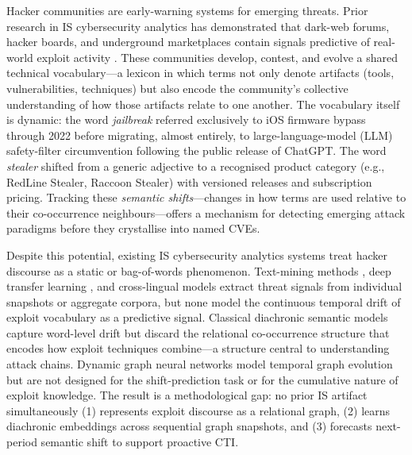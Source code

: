 \documentclass[12pt]{article}
\begin{document}
Hacker communities are early-warning systems for emerging threats. Prior research in IS cybersecurity analytics has demonstrated that dark-web forums, hacker boards, and underground marketplaces contain signals predictive of real-world exploit activity \parencite{samtani2017, samtani2022, ebrahimi2022, nunes2016}. These communities develop, contest, and evolve a shared technical vocabulary---a lexicon in which terms not only denote artifacts (tools, vulnerabilities, techniques) but also encode the community's collective understanding of how those artifacts relate to one another. The vocabulary itself is dynamic: the word \textit{jailbreak} referred exclusively to iOS firmware bypass through 2022 before migrating, almost entirely, to large-language-model (LLM) safety-filter circumvention following the public release of ChatGPT. The word \textit{stealer} shifted from a generic adjective to a recognised product category (e.g., RedLine Stealer, Raccoon Stealer) with versioned releases and subscription pricing. Tracking these \textit{semantic shifts}---changes in how terms are used relative to their co-occurrence neighbours---offers a mechanism for detecting emerging attack paradigms before they crystallise into named CVEs.

Despite this potential, existing IS cybersecurity analytics systems treat hacker discourse as a static or bag-of-words phenomenon. Text-mining methods \parencite{samtani2017, tavabi2018}, deep transfer learning \parencite{samtani2022}, and cross-lingual models \parencite{ebrahimi2022} extract threat signals from individual snapshots or aggregate corpora, but none model the continuous temporal drift of exploit vocabulary as a predictive signal. Classical diachronic semantic models \parencite{hamilton2016, kim2014} capture word-level drift but discard the relational co-occurrence structure that encodes how exploit techniques combine---a structure central to understanding attack chains. Dynamic graph neural networks \parencite{sankar2020, rossi2020} model temporal graph evolution but are not designed for the shift-prediction task or for the cumulative nature of exploit knowledge. The result is a methodological gap: no prior IS artifact simultaneously (1) represents exploit discourse as a relational graph, (2) learns diachronic embeddings across sequential graph snapshots, and (3) forecasts next-period semantic shift to support proactive CTI.
\end{document}
